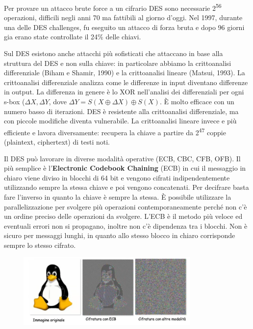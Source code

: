 Per provare un attacco brute force a un cifrario DES sono necessarie 2\textsuperscript{56} operazioni, difficili negli anni 70 ma fattibili al giorno d'oggi. Nel 1997, durante una delle DES challenges, fu eseguito un attacco di forza bruta e dopo 96 giorni gia erano state controllate il 24\% delle chiavi.

\vspace{5mm}

Sul DES esistono anche attacchi più sofisticati che attaccano in base alla struttura del DES e non sulla chiave: in particolare abbiamo la crittoanalisi differenziale (Biham e Shamir, 1990) e la crittoanalisi lineare (Matsui, 1993).
La crittoanalisi differenziale analizza come le differenze in input diventano differenze in output. La differenza in genere è lo XOR nell'analisi dei differenziali per ogni s-box ($\Delta X, \Delta Y$, dove $\Delta Y = S(X \oplus \Delta X) \oplus S(X)$. È molto efficace con un numero basso di iterazioni. DES è resistente alla crittoanalisi differenziale, ma con piccole modifiche diventa vulnerabile. La crittoanalisi lineare invece e più efficiente e lavora diversamente: recupera la chiave a partire da 2\textsuperscript{47} coppie (plaintext, ciphertext) di testi noti.

Il DES può lavorare in diverse modalità operative (ECB, CBC, CFB, OFB). Il più semplice è l'\textbf{Electronic Codebook Chaining} (ECB) in cui il messaggio in chiaro viene diviso in blocchi di 64 bit e vengono cifrati indipendentemente utilizzando sempre la stessa chiave e poi vengono concatenati. Per decifrare basta fare l'inverso in quanto la chiave è sempre la stessa. È possibile utilizzare la parallelizzazione per svolgere più operazioni contemporaneamente perché non c'è un ordine preciso delle operazioni da svolgere. L'ECB è il metodo più veloce ed eventuali errori non si propagano, inoltre non c'è dipendenza tra i blocchi. Non è sicuro per messaggi lunghi, in quanto allo stesso blocco in chiaro corrisponde sempre lo stesso cifrato.

\begin{figure}[htb!]
    \centering
    \includegraphics[width=9cm]{./Images/cap1/1.6.png}
\end{figure}

